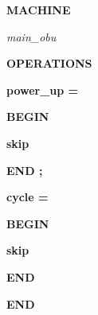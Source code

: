 

 

\bf MACHINE

\hspace*{0.20in}\it main\_obu

\hspace*{0.20in}

\hspace*{0.20in} 

\hspace*{0.20in}

\hspace*{0.20in}\bf OPERATIONS

\hspace*{0.20in}

\hspace*{0.20in}\bf power\_up \rm =

\hspace*{0.20in}\bf BEGIN

\hspace*{0.40in}\bf skip

\hspace*{0.20in}\bf END \rm ;

\hspace*{0.20in}

\hspace*{0.20in}\bf cycle \rm =

\hspace*{0.20in}\bf BEGIN

\hspace*{0.40in}\bf skip

\hspace*{0.20in}\bf END

\vspace*{12mm}
\bf END


